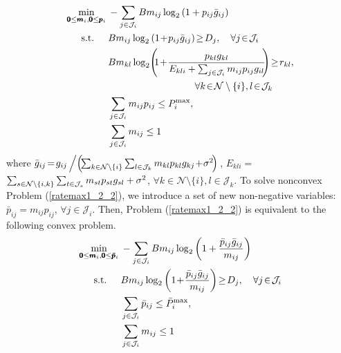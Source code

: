 \documentclass[journal]{IEEEtran}
\begin{document}
\begin{subequations}\label{ratemax1_2_2}
\begin{align}
\mathop{\min}_
{\substack{
\pmb{0} \leq \pmb{m}_i,
\pmb {0} \leq  \pmb {p}_i
}
}
\:
& -\sum_{j\in\mathcal J_i} B m_{ij}\log_2\left(1+  {p_{ij} \bar g_{ij}}   \right)
\\
\textrm{s.t.}\quad\:\:
&B m_{ij}\log_2\left(1\!+ \! {p_{ij} \bar g_{ij}} \right) \!\geq\! D_j, \quad \forall j\!\in\! \mathcal J_i\\
&B m_{kl}\log_2\!\left(\!\!1\!+ \!\frac{p_{kl} g_{kl}} {E_{kli}+\sum_{j \in {\cal{J}}_i }m_{ij} p_{ij} g_{il}}\! \!\right) \!\geq\! r_{kl},
\nonumber\\
&\qquad\qquad\qquad \qquad
\quad \forall k\!\in\!\mathcal N\setminus \{i\}, l\!\in\! \mathcal J_k\\
&\sum_{j \in {\cal{J}}_i }m_{ij} p_{ij} \leq P_i^{\max},  \\
& \sum_{j \in {\cal{J}}_i } m_{ij} \leq 1
\end{align}
\end{subequations}
where $\bar g_{ij\!}=\!{g_{ij}} \left/\left(\!{\sum_{k \in {\cal{N}}\setminus \{i\}} \sum_{l \in {\cal{J}}_k} m_{kl} p_{kl} g_{kj} \!+\!\sigma ^2}\!\right)\right.$, $E_{kli}=$ $\sum_{s \in {\cal{N}}\setminus \{i,k\}} \sum_{t \in {\cal{J}}_s} m_{st} p_{st} g_{sl} +\sigma ^2$, $\forall k\in\mathcal N\setminus \{i\}, l\in \mathcal J_k$.
To solve nonconvex Problem (\ref{ratemax1_2_2}), we introduce a set of new non-negative variables: $\bar p_{ij}=m_{ij}p_{ij}$, $\forall j \in \mathcal J_i$.
Then, Problem (\ref{ratemax1_2_2}) is equivalent to the following convex problem.
\begin{subequations}\label{ratemax1_2_3}
\begin{align}
\mathop{\min}_
{\substack{
\pmb{0} \leq \pmb{m}_i,
\pmb {0} \leq  \pmb {\bar p}_i
}
}
\:
& -\sum_{j\in\mathcal J_i}B m_{ij}\log_2\left(1+ \frac{\bar p_{ij} \bar g_{ij}} {m_{ij}} \right)
\\
\textrm{s.t.}\quad\:\:
&B m_{ij}\log_2\left(1\!+ \!\frac{\bar p_{ij} \bar g_{ij}} {m_{ij}} \right) \!\geq\! D_j, \quad \forall j\!\in\! \mathcal J_i\\
&\sum_{j \in {\cal{J}}_i }\bar p_{ij} \leq \bar P_i^{\max},  \\
& \sum_{j \in {\cal{J}}_i } m_{ij} \leq 1
\end{align}
\end{subequations}
\end{document}
